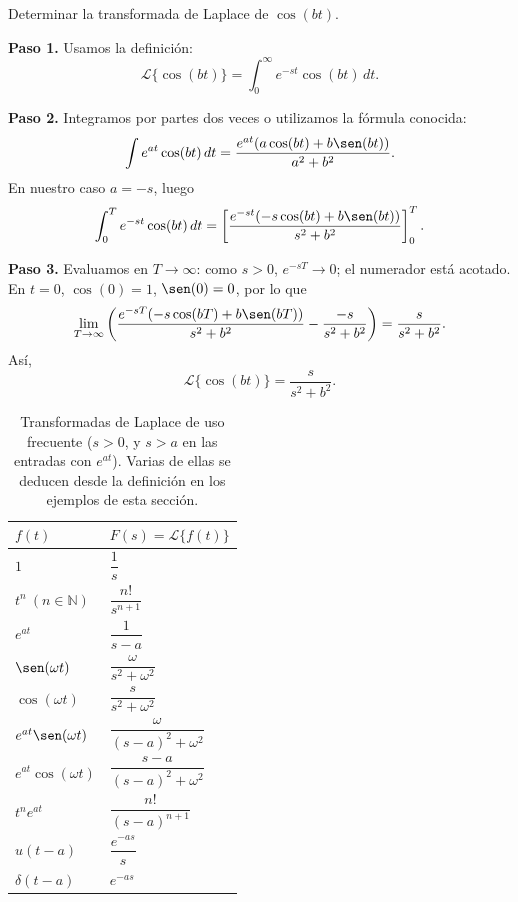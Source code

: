 \begin{example}
Determinar la transformada de Laplace de $\cos(bt)$.
\begin{myproof}
\textbf{Paso 1.} Usamos la definición:
\[
\mathcal{L}\{\cos(bt)\} = \int_0^\infty e^{-st}\cos(bt)\,dt.
\]

\textbf{Paso 2.} Integramos por partes dos veces o utilizamos la fórmula conocida:
\[
\int e^{at}\cos(bt)\,dt = \frac{e^{at}(a\cos(bt)+b\sen(bt))}{a^2+b^2}.
\]
En nuestro caso $a=-s$, luego
\[
\int_0^T e^{-st}\cos(bt)\,dt = \left[\frac{e^{-st}(-s\cos(bt)+b\sen(bt))}{s^2+b^2}\right]_0^T.
\]

\textbf{Paso 3.} Evaluamos en $T\to\infty$: como $s>0$, $e^{-sT}\to 0$; el numerador está acotado. En $t=0$, $\cos(0)=1$, $\sen(0)=0$, por lo que
\[
\lim_{T\to\infty}\left( \frac{e^{-sT}(-s\cos(bT)+b\sen(bT))}{s^2+b^2} - \frac{-s}{s^2+b^2} \right) = \frac{s}{s^2+b^2}.
\]
Así,
\[
\boxed{\mathcal{L}\{\cos(bt)\} = \frac{s}{s^2+b^2}.}
\]
\end{myproof}
\end{example}

\begin{table}[H]
\centering
\caption{Transformadas de Laplace de uso frecuente ($s>0$, y $s>a$ en las entradas con $e^{at}$). Varias de ellas se deducen desde la definición en los ejemplos de esta sección.}
\label{tab:transformadas}
\begin{tabular}{ll}
\hline
$f(t)$ & $F(s)=\mathcal{L}\{f(t)\}$ \\
\hline
$1$ & $\dfrac{1}{s}$ \\[4pt]
$t^n\ (n\in\mathbb{N})$ & $\dfrac{n!}{s^{n+1}}$ \\[4pt]
$e^{at}$ & $\dfrac{1}{s-a}$ \\[4pt]
$\sen(\omega t)$ & $\dfrac{\omega}{s^2+\omega^2}$ \\[4pt]
$\cos(\omega t)$ & $\dfrac{s}{s^2+\omega^2}$ \\[4pt]
$e^{at}\sen(\omega t)$ & $\dfrac{\omega}{(s-a)^2+\omega^2}$ \\[4pt]
$e^{at}\cos(\omega t)$ & $\dfrac{s-a}{(s-a)^2+\omega^2}$ \\[4pt]
$t^n e^{at}$ & $\dfrac{n!}{(s-a)^{n+1}}$ \\[4pt]
$u(t-a)$ & $\dfrac{e^{-as}}{s}$ \\[4pt]
$\delta(t-a)$ & $e^{-as}$ \\
\hline
\end{tabular}
\end{table}


